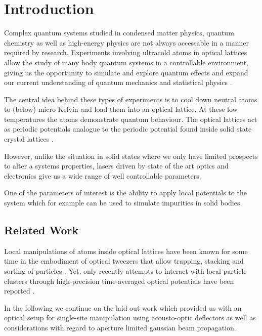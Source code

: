 \chapter{Introduction}

Complex quantum systems studied in condensed matter physics, quantum chemistry
as well as high-energy physics are not always accessable in a manner
required by research. Experiments involving ultracold atoms in optical
lattices allow the study of many body quantum systems in a controllable
environment, giving us the opportunity to simulate and explore quantum
effects and expand our current understanding of quantum mechanics and
statistical physics \cite{Gross2017}.

The central idea behind these types of experiments is to cool down neutral
atoms to (below) micro Kelvin and load them into an optical lattice. At these
low temperatures the atoms demonstrate quantum behaviour. The optical lattices
act as periodic potentials analogue to the periodic potential found inside
solid state crystal lattices \cite{Lewenstein2007}.

However, unlike the situation in solid states where we only have limited
prospects to alter a systems properties, lasers driven by state of the art
optics and electronics give us a wide range of well controllable parameters.

One of the parameters of interest is the ability to apply local potentials
to the system which for example can be used to simulate impurities in solid
bodies.

\section{Related Work}


Local manipulations of atoms inside optical lattices have been known for some
time in the embodiment of optical tweezers that allow trapping, stacking and
sorting of particles \cite{Tadmor2014}. Yet, only recently attempts to
interact with local particle clusters through high-precision time-averaged
optical potentials have been reported \cite{Roy2016}.

In the following we continue on the laid out work \cite{Hertlein2017} which
provided us with an optical setup for single-site manipulation using
acousto-optic deflectors as well as considerations with regard to
aperture limited gaussian beam propagation.


